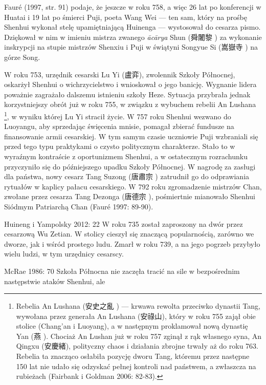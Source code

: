 Fauré (1997, str. 91) podaje, że jeszcze w roku 758, a więc 26 lat po konferencji w Huatai i 19 lat po śmierci Puji, poeta Wang Wei --- ten sam, który na prośbę Shenhui wykonał stelę upamiętniającą Huinenga --- wystosował do cesarza pismo.
Dziękował w nim w imieniu mistrza zwanego \textit{ācārya} Shun (舜闍黎 ) za wykonanie inskrypcji na stupie mistrzów Shenxiu i Puji w świątyni Songyue Si (嵩嶽寺 ) na górze Song.

W roku 753, urzędnik cesarski Lu Yi (盧弈), zwolennik Szkoły Północnej, oskarżył Shenhui o wichrzycielstwo i wnioskował o jego banicję.
Wygnanie lidera poważnie zagrażało dalszemu istnieniu szkoły Heze.
Sytuacja przybrała jednak korzystniejszy obrót już w roku 755, w związku z wybuchem rebelii An Lushana%
\footnote{Rebelia An Lushana (安史之亂 ) --- krwawa rewolta przeciwko dynastii Tang, wywołana przez generała An Lushana (安祿山), który w roku 755 zajął obie stolice (Chang'an i Luoyang), a w następnym proklamował nową dynastię Yan (燕 ). Chociaż An Lushan już w roku 757 zginął z rąk własnego syna, An Qingxu (安慶緒), polityczny chaos i działania zbrojne trwały aż do roku 763. Rebelia ta znacząco osłabiła pozycję dworu Tang, któremu przez następne 150 lat nie udało się odzyskać pełnej kontroli nad państwem, a zwłaszcza na rubieżach (Fairbank i Goldman 2006: 82-83).}, w wyniku której Lu Yi stracił życie.
W 757 roku Shenhui wezwano do Luoyangu, aby sprzedając święcenia mnisie, pomagał zbierać fundusze na finansowanie armii cesarskiej.
W tym samym czasie uczniowie Puji wzbraniali się przed tego typu praktykami o czysto politycznym charakterze.
Stało to w wyraźnym kontraście z oportunizmem Shenhui, a w ostatecznym rozrachunku przyczyniło się do późniejszego upadku Szkoły Północnej.
W nagrodę za zasługi dla państwa, nowy cesarz Tang Suzong	(唐肅宗 ) zatrudnił go do odprawiania rytuałów w kaplicy pałacu cesarskiego.
W 792 roku zgromadzenie mistrzów Chan, zwołane przez cesarza Tang Dezonga (唐德宗 ), pośmiertnie mianowało Shenhui Siódmym Patriarchą Chan
(Fauré 1997: 89-90).

Huineng i Yampolsky 2012: 22
W roku 735 został zaproszony na dwór przez cesarzową Wu Zetian. W stolicy cieszył się znaczącą popularnością, zarówno we dworze, jak i wśród prostego ludu.
Zmarł w roku 739, a na jego pogrzeb przybyło wielu ludzi, w tym urzędnicy cesarscy.

McRae 1986: 70
Szkoła Północna nie zaczęła tracić na sile w bezpośrednim następstwie ataków Shenhui, ale
\fi

